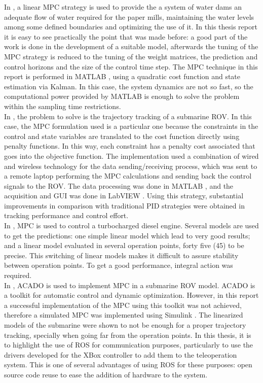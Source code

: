 In \cite{Gabrielsson2012}, a linear MPC strategy is used to provide the a system of water dams an adequate flow of water required for the paper mills, maintaining the water levels among some defined boundaries and optimizing the use of it. In this thesis report it is easy to see practically the point that was made before: a good part of the work is done in the development of a suitable model, afterwards the tuning of the MPC strategy is reduced to the tuning of the weight matrices, the prediction and control horizons and the size of the control time step. The MPC technique in this report is performed in MATLAB \textsuperscript{\textregistered}, using a quadratic cost function and state estimation via Kalman. In this case, the system dynamics are not so fast, so the computational power provided by MATLAB \textsuperscript{\textregistered} is enough to solve the problem within the sampling time restrictions.\\

In \cite{ref:Molero2011}, the problem to solve is the trajectory tracking of a submarine ROV. In this case, the MPC formulation used is a particular one because the constraints in the control and state variables are translated to the cost function directly using penalty functions. In this way, each constraint has a penalty cost associated that goes into the objective function. The implementation used a combination of wired and wireless technology for the data sending/receiving process, which was sent to a remote laptop performing the MPC calculations and sending back the control signals to the ROV. The data processing was done in MATLAB \textsuperscript{\textregistered}, and the acquisition and GUI was done in LabVIEW \texttrademark. Using this strategy, substantial improvements in comparison with traditional PID strategies were obtained in tracking performance and control effort.\\

In \cite{ref:HercegetAl2006}, MPC is used to control a turbocharged diesel engine. Several models are used to get the predictions: one simple linear model which lead to very good results; and a linear model evaluated in several operation points, forty five (45) to be precise. This switching of linear models makes it difficult to assure stability between operation points. To get a good performance, integral action was required.\\

In \cite{ref:Johansson2012}, ACADO is used to implement MPC in a submarine ROV model. ACADO is a toolkit for automatic control and dynamic optimization. However, in this report a successful implementation of the MPC using this toolkit was not achieved, therefore a simulated MPC was implemented using Simulink \textsuperscript{\textregistered}. The linearized models of the submarine were shown to not be enough for a proper trajectory tracking, specially when going far from the operation points. In this thesis, it is to highlight the use of ROS for communication purposes, particularly to use the drivers developed for the XBox controller to add them to the teleoperation system. This is one of several advantages of using ROS for these purposes: open source code reuse to ease the addition of hardware to the system.\\

